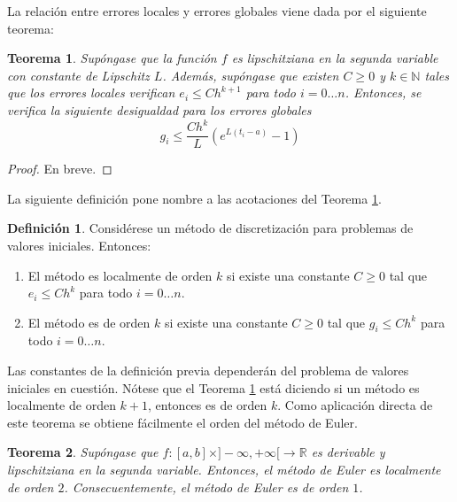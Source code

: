 \documentclass{article}
\theoremstyle{theorem-style}  %
\newtheorem{theorem}{Teorema}[section]  %
\theoremstyle{definition}
\newtheorem{definition}{Definición}[section]
\theoremstyle{example-style}
\begin{document}
	La relación entre errores locales y errores globales viene dada por el siguiente teorema: \\
	
	\begin{theorem} \label{theorem:local-global-error}
		Supóngase que la función $f$ es lipschitziana en la segunda variable con constante de Lipschitz $L$. Además, supóngase que existen $C \ge 0$ y $k \in \mathbb{N}$ tales que los errores locales verifican $e_i \le C h^{k+1}$ para todo $i = 0 \ldots n$. Entonces, se verifica la siguiente desigualdad para los errores globales
		\begin{equation}
			g_i \le \frac{C h^k}{L} (e^{L(t_i-a)}-1)
		\end{equation}
	\end{theorem} 
	\begin{proof}
		En breve.
	\end{proof}
	
	La siguiente definición pone nombre a las acotaciones del Teorema \ref{theorem:local-global-error}.
	
	\begin{definition} 
		Considérese un método de discretización para problemas de valores iniciales. Entonces:
		\begin{enumerate}
			\item El método es localmente de orden $k$ si existe una constante $C \ge 0$ tal que $e_i \le C h^k$ para todo $i = 0 \ldots n$.
			\item El método es de orden $k$ si existe una constante $C \ge 0$ tal que $g_i \le C h^k$ para todo $i = 0 \ldots n$.
		\end{enumerate}
	\end{definition}
	
	Las constantes de la definición previa dependerán del problema de valores iniciales en cuestión. Nótese que el Teorema \ref{theorem:local-global-error} está diciendo si un método es localmente de orden $k+1$, entonces es de orden $k$. Como aplicación directa de este teorema se obtiene fácilmente el orden del método de Euler.
	
	\begin{theorem}
		Supóngase que $f: [a,b] \times ]-\infty, +\infty[ \rightarrow \mathbb{R}$ es derivable y lipschitziana en la segunda variable. Entonces, el método de Euler es localmente de orden $2$. Consecuentemente, el método de Euler es de orden $1$.
	\end{theorem}
	
\end{document}
